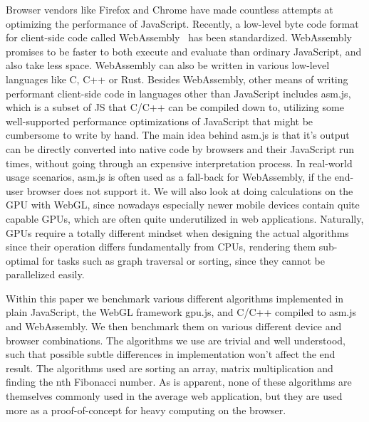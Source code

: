 \documentclass[conference]{IEEEtran}
\begin{document}
Browser vendors like Firefox and Chrome have made countless attempts at
optimizing the performance of JavaScript. Recently, a low-level byte code format
for client-side code called WebAssembly~\cite{wasmspeed} has been standardized. WebAssembly
promises to be faster to both execute and evaluate than ordinary JavaScript,
and also take less space. WebAssembly can also be written in various low-level
languages like C, C++ or Rust. Besides WebAssembly, other means of writing
performant client-side code in languages other than JavaScript includes asm.js,
which is a subset of JS that C/C++ can be compiled down to, utilizing some
well-supported performance optimizations of JavaScript that might be cumbersome
to write by hand. The main idea behind asm.js is that it’s output can be
directly converted into native code by browsers and their JavaScript run times,
without going through an expensive interpretation process. In real-world usage
scenarios, asm.js is often used as a fall-back for WebAssembly, if the end-user
browser does not support it. We will also look at doing calculations on the
GPU with WebGL, since nowadays especially newer mobile devices contain quite
capable GPUs, which are often quite underutilized in web applications.
Naturally, GPUs require a totally different mindset when designing the actual
algorithms since their operation differs fundamentally from CPUs, rendering
them sub-optimal for tasks such as graph traversal or sorting, since they cannot
be parallelized easily.

Within this paper we benchmark various different algorithms implemented in
plain JavaScript, the WebGL framework gpu.js, and C/C++ compiled to asm.js and
WebAssembly.  We then benchmark them on various different device and browser
combinations. The algorithms we use are  trivial and well understood, such that
possible subtle differences in implementation won't affect the end result. The
algorithms used are sorting an array, matrix multiplication and finding the nth
Fibonacci number. As is apparent, none of these algorithms are themselves
commonly used in the average web application, but they are used more as a
proof-of-concept for heavy computing on the browser.
\end{document}
